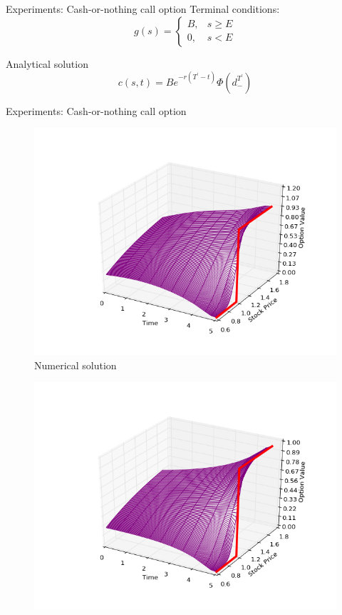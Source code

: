\documentclass{beamer}
\theoremstyle{definition}
\theoremstyle{plain}
\theoremstyle{remark}
\begin{document}
	\begin{frame}{Experiments: Cash-or-nothing call option}
		 Terminal conditions:	 
		 \[
			g(s)=\begin{cases} B, & s\geq E \\
			0, & s< E \end{cases}
		 \]	
	\begin{block}{Analytical solution}	
	\[
		c(s,t) = Be^{-r(T^{\prime}-t)}\Phi(d^{T^{\prime}}_{-} ) 
	\]	
\end{block}				
		\end{frame}
		\begin{frame}{Experiments: Cash-or-nothing call option}
\begin{minipage}{\linewidth}
      \centering
      \begin{minipage}{0.45\linewidth}
          \begin{figure}[H]
              \includegraphics[width=\linewidth]{Figures/c-o-n-call}
              \caption{Numerical solution}
          \end{figure}
      \end{minipage}
      \hspace{0.05\linewidth}
      \begin{minipage}{0.45\linewidth}
          \begin{figure}[H]
              \includegraphics[width=\linewidth]{Figures/c-o-n-call-analyt}

\end{figure}
\end{minipage}
\end{minipage}
\end{frame}
\end{document}
